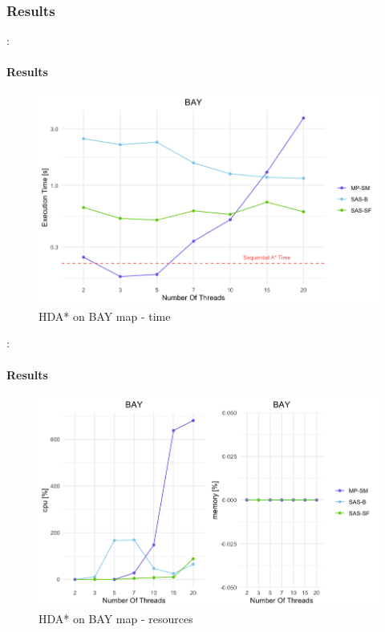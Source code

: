 \documentclass[12pt]{beamer}
\begin{document}
	\subsubsection{Results}
	\begin{frame}{\secname : \subsecname}
		\framesubtitle{Results}
		\begin{figure}[ht!]
			\centering
			\includegraphics[width=0.8\linewidth]{hda/baytime.png}
			\caption{HDA* on BAY map - time}
		\end{figure}
	\end{frame}
	\begin{frame}{\secname : \subsecname}
		\framesubtitle{Results}
		\begin{figure}[ht!]
			\centering
			\includegraphics[width=0.8\linewidth]{hda/baycpumem.png}
			\caption{HDA* on BAY map - resources}
		\end{figure}
	\end{frame}
\end{document}

